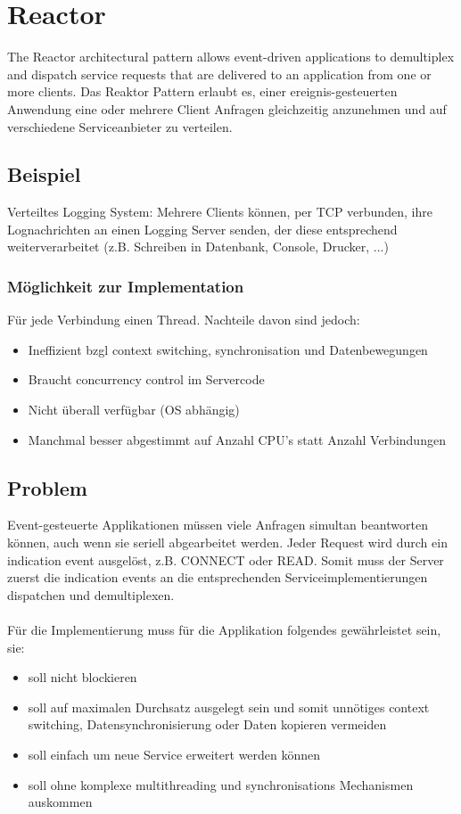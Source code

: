 \section{Reactor}
\label{sec:reactor}

The Reactor architectural pattern allows event-driven applications to demultiplex and dispatch service requests that are delivered to an application from one or more clients.
Das Reaktor Pattern erlaubt es, einer ereignis-gesteuerten Anwendung eine oder mehrere Client Anfragen gleichzeitig anzunehmen und auf verschiedene Serviceanbieter zu verteilen.


\subsection*{Beispiel}

Verteiltes Logging System: Mehrere Clients können, per TCP verbunden, ihre Lognachrichten an einen Logging Server senden, der diese entsprechend weiterverarbeitet (z.B. Schreiben in Datenbank, Console, Drucker, ...)

\subsubsection*{Möglichkeit zur Implementation}

Für jede Verbindung einen Thread. Nachteile davon sind jedoch:
\begin{itemize}
	\item Ineffizient bzgl context switching, synchronisation und Datenbewegungen
	\item Braucht concurrency control im Servercode
	\item Nicht überall verfügbar (OS abhängig)
	\item Manchmal besser abgestimmt auf Anzahl CPU’s statt Anzahl Verbindungen
\end{itemize}


\subsection*{Problem}
Event-gesteuerte Applikationen müssen viele Anfragen simultan beantworten können, auch wenn sie seriell abgearbeitet werden. Jeder Request wird durch ein indication event ausgelöst, z.B. CONNECT oder READ. Somit muss der Server zuerst die indication events an die entsprechenden Serviceimplementierungen dispatchen und demultiplexen.\\
\\
Für die Implementierung muss für die Applikation folgendes gewährleistet sein, sie:
\begin{itemize}
	\item soll nicht blockieren
	\item soll auf maximalen Durchsatz ausgelegt sein und somit unnötiges context switching, Datensynchronisierung oder Daten kopieren vermeiden
	\item soll einfach um neue Service erweitert werden können
	\item soll ohne komplexe multithreading und synchronisations Mechanismen auskommen
\end{itemize}



